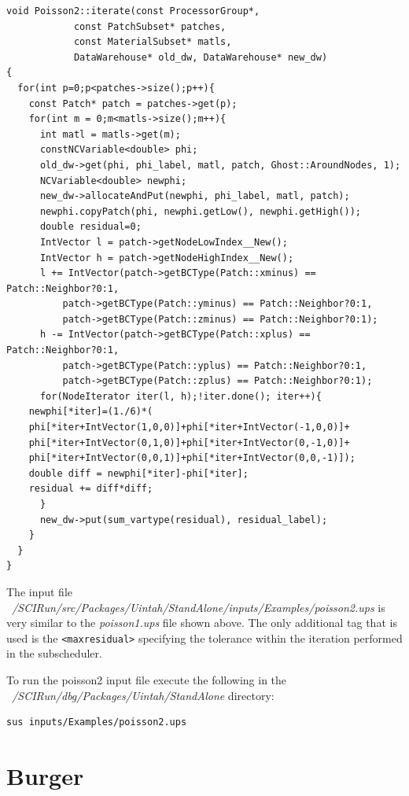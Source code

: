 \documentclass[12pt]{report}
\begin{document}
\begin{Verbatim}[fontsize=\footnotesize]
void Poisson2::iterate(const ProcessorGroup*,
		    const PatchSubset* patches,
		    const MaterialSubset* matls,
		    DataWarehouse* old_dw, DataWarehouse* new_dw)
{
  for(int p=0;p<patches->size();p++){
    const Patch* patch = patches->get(p);
    for(int m = 0;m<matls->size();m++){
      int matl = matls->get(m);
      constNCVariable<double> phi;
      old_dw->get(phi, phi_label, matl, patch, Ghost::AroundNodes, 1);
      NCVariable<double> newphi;
      new_dw->allocateAndPut(newphi, phi_label, matl, patch);
      newphi.copyPatch(phi, newphi.getLow(), newphi.getHigh());
      double residual=0;
      IntVector l = patch->getNodeLowIndex__New();
      IntVector h = patch->getNodeHighIndex__New(); 
      l += IntVector(patch->getBCType(Patch::xminus) == Patch::Neighbor?0:1,
		  patch->getBCType(Patch::yminus) == Patch::Neighbor?0:1,
		  patch->getBCType(Patch::zminus) == Patch::Neighbor?0:1);
      h -= IntVector(patch->getBCType(Patch::xplus) == Patch::Neighbor?0:1,
		  patch->getBCType(Patch::yplus) == Patch::Neighbor?0:1,
		  patch->getBCType(Patch::zplus) == Patch::Neighbor?0:1);
      for(NodeIterator iter(l, h);!iter.done(); iter++){
	newphi[*iter]=(1./6)*(
	phi[*iter+IntVector(1,0,0)]+phi[*iter+IntVector(-1,0,0)]+
	phi[*iter+IntVector(0,1,0)]+phi[*iter+IntVector(0,-1,0)]+
	phi[*iter+IntVector(0,0,1)]+phi[*iter+IntVector(0,0,-1)]);
	double diff = newphi[*iter]-phi[*iter];
	residual += diff*diff;
      }
      new_dw->put(sum_vartype(residual), residual_label);
    }
  }
}

\end{Verbatim}

The input file
\emph{~/SCIRun/src/Packages/Uintah/StandAlone/inputs/Examples/poisson2.ups}
is very similar to the \emph{poisson1.ups} file shown above.  The only
additional tag that is used is the \texttt{<maxresidual>} specifying
the tolerance within the iteration performed in the subscheduler.

To run the poisson2 input file execute the following in the
\emph{~/SCIRun/dbg/Packages/Uintah/StandAlone} directory:

\begin{Verbatim}[fontsize=\footnotesize]
	sus inputs/Examples/poisson2.ups

\end{Verbatim}


\section{Burger}
\end{document}

